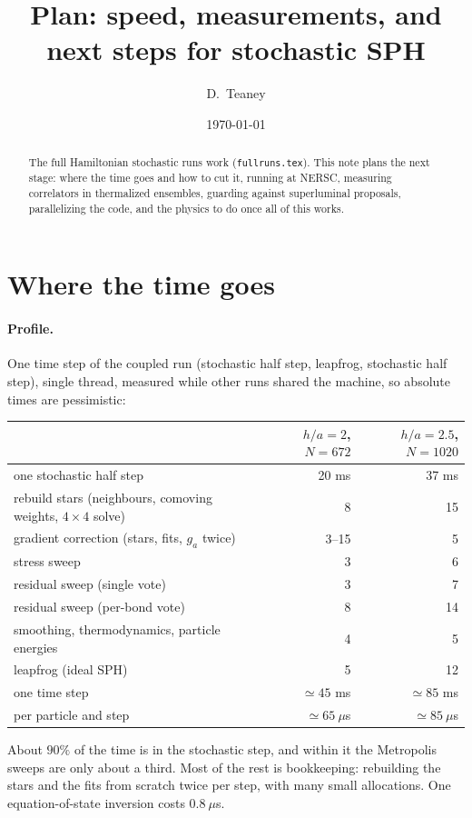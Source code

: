 \documentclass[11pt,aps,preprint,nofootinbib,superscriptaddress,tightenlines]{revtex4-2}
\let\oldparagraph\paragraph
\renewcommand{\paragraph}{\par\bigskip\oldparagraph}
\begin{document}
\title{Plan: speed, measurements, and next steps for stochastic SPH}
\author{D.~Teaney}
\date{\today}

\begin{abstract}
The full Hamiltonian stochastic runs work (\texttt{fullruns.tex}).  This note
plans the next stage: where the time goes and how to cut it, running at
NERSC, measuring correlators in thermalized ensembles, guarding against
superluminal proposals, parallelizing the code, and the physics to do once
all of this works.
\end{abstract}

\maketitle

\section{Where the time goes}
\label{sec:time}

\paragraph{Profile.}  One time step of the coupled run (stochastic half step,
leapfrog, stochastic half step), single thread, measured while other runs
shared the machine, so absolute times are pessimistic:
\begin{center}
\begin{tabular}{lrr}
\hline
 & $h/a=2$, $N=672$ & $h/a=2.5$, $N=1020$ \\ \hline
one stochastic half step & 20 ms & 37 ms \\
\quad rebuild stars (neighbours, comoving weights, $4\times4$ solve) & 8 & 15 \\
\quad gradient correction (stars, fits, $g_a$ twice) & 3--15 & 5 \\
\quad stress sweep & 3 & 6 \\
\quad residual sweep (single vote) & 3 & 7 \\
\quad residual sweep (per-bond vote) & 8 & 14 \\
\quad smoothing, thermodynamics, particle energies & 4 & 5 \\
leapfrog (ideal SPH) & 5 & 12 \\ \hline
one time step & $\simeq45$ ms & $\simeq85$ ms \\
per particle and step & $\simeq65\ \mu$s & $\simeq85\ \mu$s \\
\hline
\end{tabular}
\end{center}
About $90\%$ of the time is in the stochastic step, and within it the
Metropolis sweeps are only about a third.  Most of the rest is bookkeeping:
rebuilding the stars and the fits from scratch twice per step, with many
small allocations.  One equation-of-state inversion costs $0.8\ \mu$s.
\end{document}
